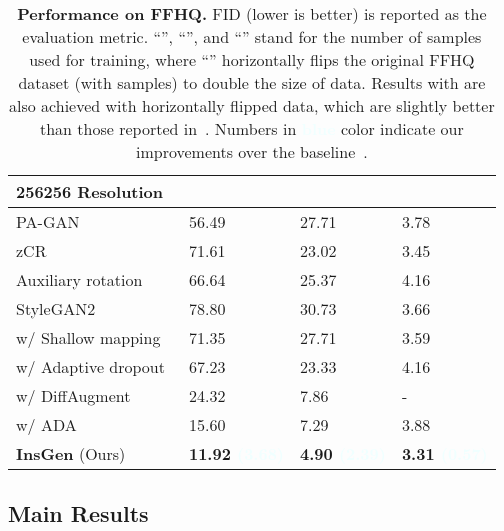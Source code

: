 \documentclass{article}
\begin{document}
\setlength{\tabcolsep}{15pt}
\begin{table}[t]
    \centering
    \caption{
        \textbf{Performance on FFHQ.}
FID (lower is better) is reported as the evaluation metric.
``'', ``'', and ``'' stand for the number of samples used for training, where ``'' horizontally flips the     original FFHQ dataset (with  samples) to double the size of data.
Results with  are also achieved with horizontally flipped data, which are slightly better than those reported     in~\cite{karras2020training}.
Numbers in \textbf{\textcolor{azure}{blue}} color indicate our improvements over the baseline~\cite{karras2020training}.
    }
    \label{table:sota-ffhq}
    \vspace{0pt}
    \begin{tabular}{llll}
        \toprule
        256256 Resolution                     &     &   &  \\
        \midrule
        PA-GAN~\cite{zhang2018pa}                     & 56.49  & 27.71  & 3.78 \\
        zCR~\cite{zhao2020improved}                   & 71.61  & 23.02  & 3.45 \\
        Auxiliary rotation~\cite{chen2019self}        & 66.64  & 25.37  & 4.16 \\
        \midrule
        StyleGAN2~\cite{karras2019style}              & 78.80  & 30.73  & 3.66 \\
        w/ Shallow mapping~\cite{karras2020training}  & 71.35  & 27.71  & 3.59 \\
        w/ Adaptive dropout~\cite{karras2020training} & 67.23  & 23.33  & 4.16 \\
        w/ DiffAugment~\cite{zhao2020differentiable}  & 24.32  & 7.86   & -    \\
        w/ ADA~\cite{karras2020training}              & 15.60  & 7.29   & 3.88 \\
        \midrule
        \textbf{InsGen} (Ours) & \textbf{11.92 \textcolor{azure}{(3.68)}}  & \textbf{4.90 \textcolor{azure}{(2.39)}}  & \textbf{3.31 \textcolor{azure}{(0.57)}} \\
        \bottomrule
    \end{tabular}
    \vspace{-10pt}
\end{table}


\subsection{Main Results}\label{subsec:sota}
\end{document}
